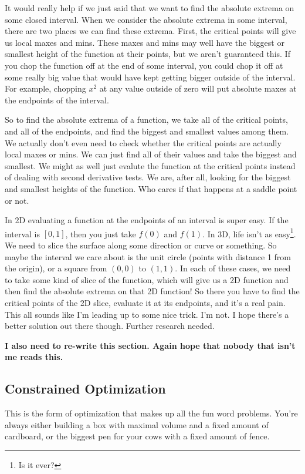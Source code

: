 \documentclass[12pt, letterpaper]{article}
\begin{document}
It would really help if we just said that we want to find the absolute extrema on some closed interval.
When we consider the absolute extrema in some interval, there are two places we can find these extrema.
First, the critical points will give us local maxes and mins. 
These maxes and mins may well have the biggest or smallest height of the function at their points, but we aren't guaranteed this.
If you chop the function off at the end of some interval, you could chop it off at some really big value that would have kept getting bigger outside of the interval.
For example, chopping $x^2$ at any value outside of zero will put absolute maxes at the endpoints of the interval. 

So to find the absolute extrema of a function, we take all of the critical points, and all of the endpoints, and find the biggest and smallest values among them.
We actually don't even need to check whether the critical points are actually local maxes or mins. We can just find all of their values and take the biggest and smallest.
We might as well just evalute the function at the critical points instead of dealing with second derivative tests.
We are, after all, looking for the biggest and smallest heights of the function.
Who cares if that happens at a saddle point or not.

In 2D evaluating a function at the endpoints of an interval is super easy. If the interval is $[0, 1]$, then you just take $f(0)$ and $f(1)$.
In 3D, life isn't as easy\footnote{Is it ever?}.
We need to slice the surface along some direction or curve or something.
So maybe the interval we care about is the unit circle (points with distance 1 from the origin), or a square from $(0, 0)$ to $(1, 1)$.
In each of these cases, we need to take some kind of slice of the function, which will give us a 2D function and then find the absolute extrema on that 2D function!
So there you have to find the critical points of the 2D slice, evaluate it at its endpoints, and it's a real pain.
This all sounds like I'm leading up to some nice trick. I'm not. I hope there's a better solution out there though.
Further research needed.

\textbf{I also need to re-write this section. Again hope that nobody that isn't me reads this.}

\subsection{Constrained Optimization}
This is the form of optimization that makes up all the fun word problems.
You're always either building a box with maximal volume and a fixed amount of cardboard,
or the biggest pen for your cows with a fixed amount of fence.
\end{document}
